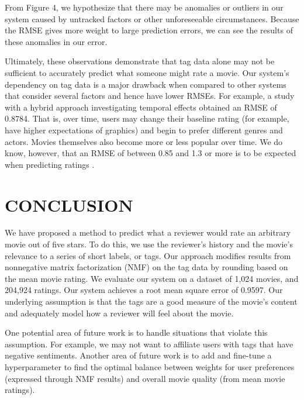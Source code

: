 \documentclass[letterpaper, 10 pt, conference]{ieeeconf}  %
\begin{document}
From Figure 4, we hypothesize that there may be anomalies or outliers in our system caused by untracked factors or other unforeseeable circumstances. Because the RMSE gives more weight to large prediction errors, we can see the results of these anomalies in our error. 

Ultimately, these observations demonstrate that tag data alone may not be sufficient to accurately predict what someone might rate a movie. Our system's dependency on tag data is a major drawback when compared to other systems that consider several factors and hence have lower RMSEs. For example, a study with a hybrid approach investigating temporal effects \cite{netflix} obtained an RMSE of 0.8784. That is, over time, users may change their baseline rating (for example, have higher expectations of graphics) and begin to prefer different genres and actors.
Movies themselves also become more or less popular over time. We do know, however, that an RMSE of between 0.85 and 1.3 or more is to be expected when predicting ratings \cite{netflix}.

\medbreak
\section{CONCLUSION}

We have proposed a method to predict what a reviewer would rate an arbitrary movie out of five stars. To do this, we use the reviewer's history and the movie's relevance to a series of short labels, or tags.
Our approach modifies results from nonnegative matrix factorization (NMF) on the tag data by rounding based on the mean movie rating. We evaluate our system on a dataset of 1,024 movies, and 204,924 ratings.
Our system achieves a root mean square error of 0.9597.
Our underlying assumption is that the tags are a good measure of the movie's content and adequately model how a reviewer will feel about the movie.

One potential area of future work is to handle situations that violate this assumption. For example, we may not want to affiliate users with tags that have negative sentiments. Another area of future work is to add and fine-tune a hyperparameter to find the optimal balance between weights for user preferences (expressed through NMF results) and overall movie quality (from mean movie ratings).




\end{document}
